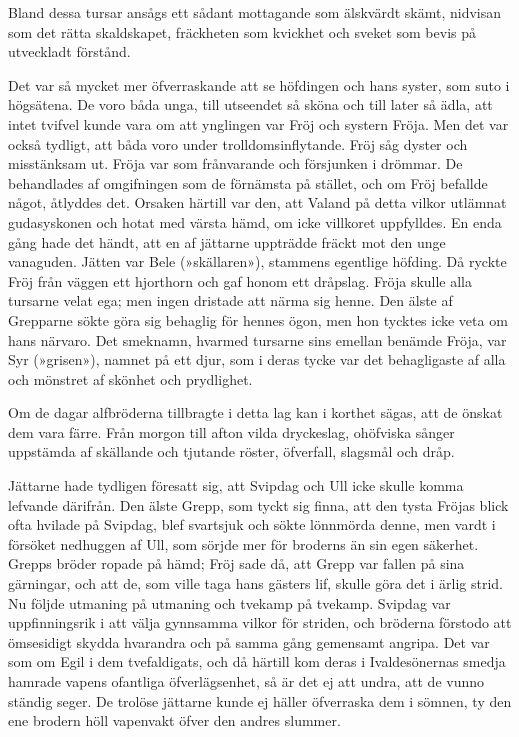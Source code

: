 Bland dessa tursar ansågs ett sådant mottagande som älskvärdt skämt,
nidvisan som det rätta skaldskapet, fräckheten som kvickhet och sveket
som bevis på utveckladt förstånd.

Det var så mycket mer öfverraskande att se höfdingen och hans syster,
som suto i högsätena. De voro båda unga, till utseendet så sköna och
till later så ädla, att intet tvifvel kunde vara om att ynglingen var
Fröj och systern Fröja. Men det var också tydligt, att båda voro under
trolldomsinflytande. Fröj såg dyster och misstänksam ut. Fröja var som
frånvarande och försjunken i drömmar. De behandlades af omgifningen som
de förnämsta på stället, och om Fröj befallde något, åtlyddes det.
Orsaken härtill var den, att Valand på detta vilkor utlämnat
gudasyskonen och hotat med värsta hämd, om icke villkoret uppfylldes. En
enda gång hade det händt, att en af jättarne uppträdde fräckt mot den
unge vanaguden. Jätten var Bele (»skällaren»), stammens egentlige
höfding. Då ryckte Fröj från väggen ett hjorthorn och gaf honom ett
dråpslag. Fröja skulle alla tursarne velat ega; men ingen dristade att
närma sig henne. Den älste af Grepparne sökte göra sig behaglig för
hennes ögon, men hon tycktes icke veta om hans närvaro. Det smeknamn,
hvarmed tursarne sins emellan benämde Fröja, var Syr (»grisen»), namnet
på ett djur, som i deras tycke var det behagligaste af alla och mönstret
af skönhet och prydlighet.

Om de dagar alfbröderna tillbragte i detta lag kan i korthet sägas, att
de önskat dem vara färre. Från morgon till afton vilda dryckeslag,
ohöfviska sånger uppstämda af skällande och tjutande röster, öfverfall,
slagsmål och dråp.

Jättarne hade tydligen föresatt sig, att Svipdag och Ull icke skulle
komma lefvande därifrån. Den älste Grepp, som tyckt sig finna, att den
tysta Fröjas blick ofta hvilade på Svipdag, blef svartsjuk och sökte
lönnmörda denne, men vardt i försöket nedhuggen af Ull, som sörjde mer
för broderns än sin egen säkerhet. Grepps bröder ropade på hämd; Fröj
sade då, att Grepp var fallen på sina gärningar, och att de, som ville
taga hans gästers lif, skulle göra det i ärlig strid. Nu följde utmaning
på utmaning och tvekamp på tvekamp. Svipdag var uppfinningsrik i att
välja gynnsamma vilkor för striden, och bröderna förstodo att ömsesidigt
skydda hvarandra och på samma gång gemensamt angripa. Det var som om
Egil i dem tvefaldigats, och då härtill kom deras i Ivaldesönernas
smedja hamrade vapens ofantliga öfverlägsenhet, så är det ej att undra,
att de vunno ständig seger. De trolöse jättarne kunde ej häller
öfverraska dem i sömnen, ty den ene brodern höll vapenvakt öfver den
andres slummer.


